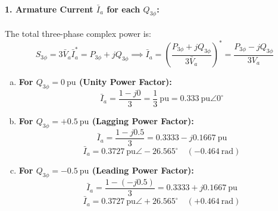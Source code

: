 \paragraph{1. Armature Current $\bar{I}_a$ for each $Q_{3\phi}$:}
The total three-phase complex power is:
\[
S_{3\phi} = 3 \bar{V}_a \bar{I}_a^* = P_{3\phi} + j Q_{3\phi} \implies \bar{I}_a = \left( \frac{P_{3\phi} + j Q_{3\phi}}{3 \bar{V}_a} \right)^* = \frac{P_{3\phi} - j Q_{3\phi}}{3 V_a}
\]

\begin{enumerate}[(a)]
    \item \textbf{For $Q_{3\phi} = 0\ \text{pu}$ (Unity Power Factor):}
    \begin{equation}
        \boxed{\bar{I}_a = \frac{1 - j0}{3} = \frac{1}{3}\ \text{pu} = 0.333\ \text{pu} \angle 0^\circ}
    \end{equation}

    \item \textbf{For $Q_{3\phi} = +0.5\ \text{pu}$ (Lagging Power Factor):}
    \begin{equation}
        \bar{I}_a = \frac{1 - j0.5}{3} = 0.3333 - j 0.1667\ \text{pu}
    \end{equation}
    \begin{equation}
        \boxed{\bar{I}_a = 0.3727\ \text{pu} \angle -26.565^\circ \quad (-0.464\ \text{rad})}
    \end{equation}

    \item \textbf{For $Q_{3\phi} = -0.5\ \text{pu}$ (Leading Power Factor):}
    \begin{equation}
        \bar{I}_a = \frac{1 - (-j0.5)}{3} = 0.3333 + j 0.1667\ \text{pu}
    \end{equation}
    \begin{equation}
        \boxed{\bar{I}_a = 0.3727\ \text{pu} \angle +26.565^\circ \quad (+0.464\ \text{rad})}
    \end{equation}
\end{enumerate}

